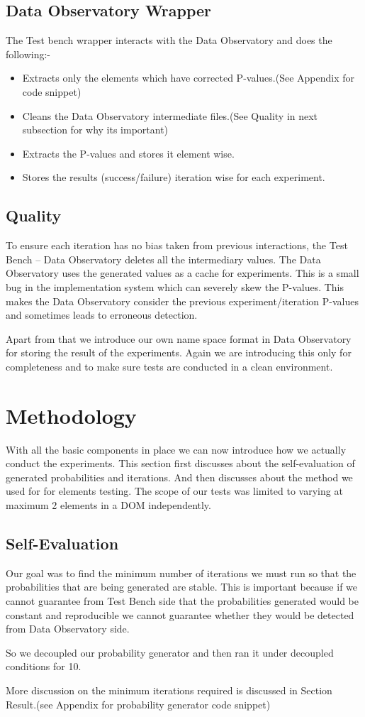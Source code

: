 \documentclass[fleqn,12pt]{SelfArx} %
\begin{document}
\subsection{Data Observatory Wrapper}
The Test bench wrapper interacts with the Data Observatory and does the following:-
\begin{itemize}
\item Extracts only the elements which have corrected P-values.(See Appendix for code snippet)
\item Cleans the Data Observatory intermediate files.(See Quality in next subsection for why its important) 
\item Extracts the P-values and stores it element wise.
\item Stores the results (success/failure) iteration wise for each experiment.
\end{itemize}
\subsection{Quality}
To ensure each iteration has no bias taken from previous interactions, the Test Bench – Data Observatory deletes all the intermediary values. The Data Observatory uses the generated values as a cache for experiments. This is a small bug in the implementation system which can severely skew the P-values. This makes the Data Observatory consider the previous experiment/iteration P-values and sometimes leads to erroneous detection.\par
Apart from that we introduce our own name space format in Data Observatory for storing the result of the experiments. Again we are introducing this only for completeness and to make sure tests are conducted in a clean environment.

\section{Methodology}
With all the basic components in place we can now introduce how we actually conduct the experiments. This section first discusses about the self-evaluation of generated probabilities and iterations. And then discusses about the method we used for for elements testing. The scope of our tests was limited to varying at maximum 2 elements in a DOM independently.

\subsection{Self-Evaluation}
Our goal was to find the minimum number of iterations we must run so that the probabilities that are being generated are stable. This is important because if we cannot guarantee from Test Bench side that the probabilities generated would be constant and reproducible we cannot guarantee whether they would be detected from Data Observatory side.\par
So we decoupled our probability generator and then ran it under decoupled conditions for 10.\par
More discussion on the minimum iterations required is discussed in Section Result.(see Appendix for probability generator code snippet)
\end{document}
